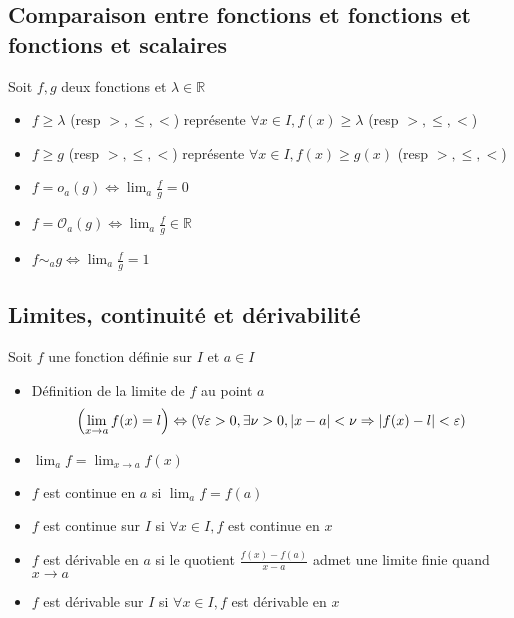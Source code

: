 \documentclass[11pt,colorlinks]{book}
\theoremstyle{mytheoremstyle}
\theoremstyle{mytheoremstyle}
\theoremstyle{mytheoremstyle}
\theoremstyle{mytheoremstyle}
\theoremstyle{mytheoremstyle}
\theoremstyle{mytheoremstyle}
\theoremstyle{mytheoremstyle}
\theoremstyle{mytheoremstyle}
\theoremstyle{myproblemstyle}
\def\mbb#1{\mathbb{#1}}
\def\bR{\mbb{R}}
\renewcommand{\equiv}{\sim}
\begin{document}
\subsection{Comparaison entre fonctions et fonctions et fonctions et scalaires}
\begin{rmq}
  Soit $f,g$ deux fonctions et $\lambda \in \bR$
  \begin{itemize}
  \item $f \geq \lambda$ (resp $>, \leq, <$) représente $\forall x \in I, f(x) \geq \lambda$ (resp $>,\leq,<$)
  \item $f \geq g$ (resp $>,\leq,<$) représente $\forall x \in I, f(x) \geq g(x)$ (resp $>,\leq,<$)
  \item $f = o_a(g) \Leftrightarrow \lim_a \frac{f}{g} = 0$
  \item $f = \mathcal{O}_a(g) \Leftrightarrow \lim_a \frac{f}{g} \in \bR$
  \item $f \equiv_a g \Leftrightarrow \lim_a \frac{f}{g} = 1$
  \end{itemize}
\end{rmq}
\subsection{Limites, continuité et dérivabilité}
\begin{rmq}
  Soit $f$ une fonction définie sur $I$ et $a \in I$
  \begin{itemize}
    \item Définition de la limite de $f$ au point $a$
    \begin{equation*}
      \left(\lim_{x \to a} f(x) = l\right) \Leftrightarrow \left(\forall \varepsilon > 0, \exists 
      \nu > 0, \abs{x-a} < \nu \Rightarrow \abs{f(x) - l} < \varepsilon\right)
    \end{equation*}
    \item $\lim_a f = \lim_{x \to a} f(x)$ 
    \item $f$ est continue en $a$ si $\lim_a f = f(a)$ 
    \item $f$ est continue sur $I$ si $\forall x \in I, f$ est continue en $x$
    \item $f$ est dérivable en $a$ si le quotient $\frac{f(x) - f(a)}{x - a}$ admet une limite finie quand $x \to a$
    \item $f$ est dérivable sur $I$ si $\forall x \in I, f$ est dérivable en $x$
  \end{itemize}
\end{rmq}
\end{document}

